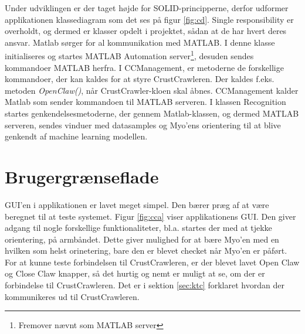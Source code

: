 
Under udviklingen er der taget højde for SOLID-principperne\citep{RefWorks:10}, derfor udformer applikationen klassediagram som det ses på figur \ref{fig:cd}. Single responsibility\citep{RefWorks:9} er overholdt, og dermed er klasser opdelt i projektet, sådan at de har hvert deres ansvar. Matlab sørger for al kommunikation med MATLAB. I denne klasse initialiseres og startes MATLAB Automation server\footnote{Fremover nævnt som MATLAB server}, desuden sendes kommandoer MATLAB herfra. I CCManagement, er metoderne de forskellige kommandoer, der kan kaldes for at styre CrustCrawleren. Der kaldes f.eks. metoden \textit{OpenClaw()}, når CrustCrawler-kloen skal åbnes. CCManagement kalder Matlab som sender kommandoen til MATLAB serveren. I klassen Recognition startes genkendelsesmetoderne, der gennem Matlab-klassen, og dermed MATLAB serveren, sendes vinduer med datasamples og Myo'ens orientering til at blive genkendt af machine learning modellen.



\section{Brugergrænseflade}

GUI'en i applikationen er lavet meget simpel. Den bærer præg af at være beregnet til at teste systemet. Figur \ref{fig:cca} viser applikationens GUI. Den giver adgang til nogle forskellige funktionaliteter, bl.a. startes der med at tjekke orientering, på armbåndet. Dette giver mulighed for at bære Myo'en med en hvilken som helst orinetering, bare den er blevet checket når Myo'en er påført. For at kunne teste forbindelsen til CrustCrawleren, er der blevet lavet Open Claw og Close Claw knapper, så det hurtig og nemt er muligt at se, om der er forbindelse til CrustCrawleren. Det er i sektion \ref{sec:ktc} forklaret hvordan der kommunikeres ud til CrustCrawleren.


